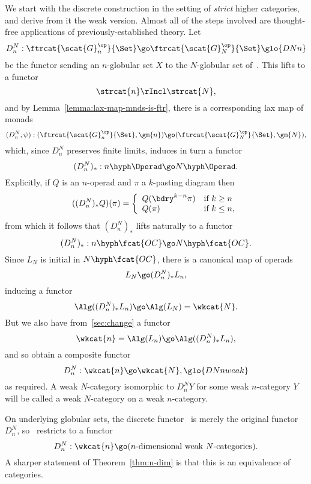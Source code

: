 We start with the discrete construction in the setting of \emph{strict}%
%
%
higher categories, and derive from it the weak version.  Almost all of the
steps involved are thought-free applications of previously-established
theory.  Let
\[
D^N_n: 
\ftrcat{\scat{G}_n^\op}{\Set}
\go 
\ftrcat{\scat{G}_N^\op}{\Set}%
% 
\glo{DNn}
% 
\]
be the functor sending an $n$-globular set $X$ to the $N$-globular
set of~.  This lifts to a functor
\[
\strcat{n} \rIncl \strcat{N},%
%
\index{n-category@$n$-category!strict!discrete}
%
\]
and by Lemma~\ref{lemma:lax-map-mnds-is-ftr}, there is a corresponding lax
map of monads
\[
(D^N_n, \psi): 
(\ftrcat{\scat{G}_n^\op}{\Set}, \gm{n})
\go 
(\ftrcat{\scat{G}_N^\op}{\Set}, \gm{N}), 
\]
which, since $D^N_n$ preserves finite limits, induces in turn a functor
\[
(D^N_n)_*:
n\hyph\Operad
\go
N\hyph\Operad.
\]
Explicitly, if $Q$ is an $n$-operad and $\pi$ a $k$-pasting diagram then
\[
((D^N_n)_* Q)(\pi)
=
\left\{
\begin{array}{ll}
Q(\bdry^{k-n} \pi)	&\textrm{if } k \geq n	\\
Q(\pi)			&\textrm{if } k\leq n,
\end{array}
\right.
\]
from which it follows that $(D^N_n)_*$ lifts naturally to a functor
\[
(D^N_n)_*: 
n\hyph\fcat{OC}
\go
N\hyph\fcat{OC}.
\]
Since $L_N$ is initial in $N\hyph\fcat{OC}$, there is a canonical map of
operads
\[
L_N \go (D^N_n)_* L_n,
\]
inducing a functor
\[
\Alg((D^N_n)_* L_n)
\go
\Alg(L_N) = \wkcat{N}.
\]
But we also have from~\ref{sec:change} a functor
\[
\wkcat{n} = \Alg(L_n)
\go
\Alg((D^N_n)_* L_n),
\]
and so obtain a composite functor
%
\begin{equation}	\label{eq:wk-disc-functor}
D^N_n: \wkcat{n} \go \wkcat{N},%
% 
\glo{DNnweak}
% 
\end{equation}
%
as required.  A weak $N$-category isomorphic to $D^N_n Y$ for some weak
$n$-category $Y$ will be called a %
%
%
weak $N$-category on a weak $n$-category.

On underlying globular sets, the discrete functor~
is merely the original functor $D^N_n$, so~
restricts to a functor
%
\begin{equation}	\label{eq:n-dim-eqv}
D^N_n:
\wkcat{n}
\go
(n \textup{-dimensional weak } N \textup{-categories}).
\end{equation}
%
A sharper statement of Theorem~\ref{thm:n-dim} is that this is an
equivalence of categories.

